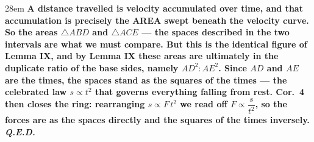 \documentclass[border=4pt]{standalone}
\begin{document}
\begin{varwidth}{28em}
\large\bfseries
A distance travelled is velocity accumulated over time, and that accumulation is precisely      the AREA swept beneath the velocity curve. So the \textcolor{spacered}{areas $\triangle ABD$ and      $\triangle ACE$ — the spaces described} in the two intervals are what we must compare. But      this is the identical figure of Lemma IX, and by Lemma IX these areas are ultimately in the      duplicate ratio of the base sides, namely $AD^2 : AE^2$. Since \textcolor{timeblue}{$AD$ and $AE$ are      the times}, the spaces stand as the squares of the times — the celebrated law $s \propto t^2$      that governs everything falling from rest. Cor.\ 4 then closes the ring: rearranging      $s \propto F\,t^2$ we read off $F \propto \dfrac{s}{t^2}$, so the forces are as the spaces      directly and the squares of the times inversely. \textit{Q.E.D.}
\end{varwidth}
\end{document}

